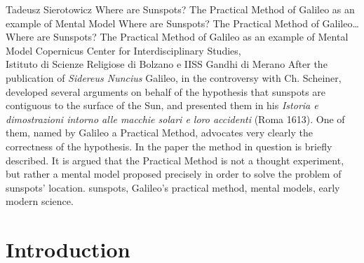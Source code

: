 \begin{artengenv}
	{Tadeusz Sierotowicz}
	{Where are Sunspots? The Practical Method of Galileo as an example of Mental Model}
	{Where are Sunspots? The Practical Method of Galileo\ldots}
	{Where are Sunspots? The Practical Method of Galileo as an example of Mental Model}
	{Copernicus Center for Interdisciplinary Studies,\\
		Istituto di Scienze Religiose di Bolzano e IISS Gandhi di Merano}
	{After the publication of \textit{Sidereus Nuncius} Galileo, in the controversy with Ch.
		Scheiner, developed several arguments on behalf of the hypothesis that sunspots are contiguous to the surface of the
		Sun, and presented them in his \textit{Istoria e dimostrazioni intorno alle macchie solari e loro accidenti}
		(Roma 1613). One of them, named by Galileo a Practical Method, advocates very clearly the correctness of the
		hypothesis. In the paper the method in question is briefly described. It is argued that the Practical Method is not a
		thought experiment, but rather a mental model proposed precisely in order to solve the problem of sunspots’ location. }
	{sunspots, Galileo’s practical method, mental models, early modern science.}
















\section{Introduction}


\end{artengenv}
